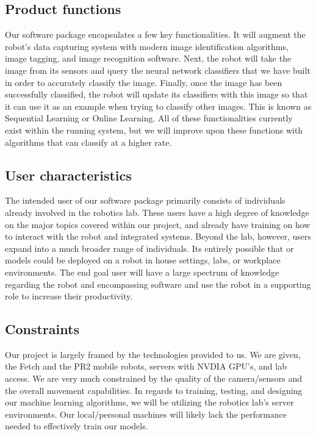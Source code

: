 \documentclass[draftclsnofoot, onecolumn, 10pt, compsoc]{IEEEtran}
\begin{document}
\subsection{Product functions}
Our software package encapsulates a few key functionalities. It will augment the robot's data capturing system with modern image identification algorithms, image tagging, and image recognition software. Next, the robot will take the image from its sensors and query the neural network classifiers that we have built in order to accurately classify the image. Finally, once the image has been successfully classified, the robot will update its classifiers with this image so that it can use it as an example when trying to classify other images. This is known as Sequential Learning or Online Learning. All of these functionalities currently exist within the running system, but we will improve upon these functions with algorithms that can classify at a higher rate.

\subsection{User characteristics}
The intended user of our software package primarily consists of individuals already involved in the robotics lab. These users have a high degree of knowledge on the major topics covered within our project, and already have training on how to interact with the robot and integrated systems. Beyond the lab, however, users expand into a much broader range of individuals. Its entirely possible that or models could be deployed on a robot in house settings, labs, or workplace environments. The end goal user will have a large spectrum of knowledge regarding the robot and encompassing software and use the robot in a supporting role to increase their productivity.

\subsection{Constraints}
Our project is largely framed by the technologies provided to us. We are given, the Fetch and the PR2 mobile robots, servers with NVDIA GPU's, and lab access. We are very much constrained by the quality of the camera/sensors and the overall movement capabilities. In regards to training, testing, and designing our machine learning algorithms, we will be utilizing the robotics lab's server environments. Our local/personal machines will likely lack the performance needed to effectively train our models.   
\end{document}
